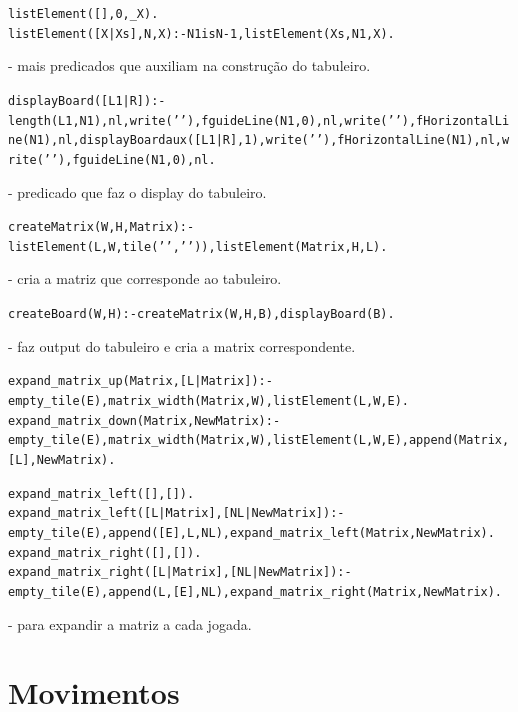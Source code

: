 \documentclass[a4paper]{article}
\begin{document}
\begin{alltt}
	listElement([],0, _X).
	listElement([X|Xs], N, X) :- N1 is N - 1,  listElement(Xs, N1, X).
\end{alltt}
		\normalfont - mais predicados que auxiliam na construção do tabuleiro. 
\begin{alltt}
	displayBoard([L1|R]) :-  length(L1,N1), nl,write('  '), \newline fguideLine(N1, 0), nl,write('  '), fHorizontalLine(N1), \newline nl, displayBoardaux([L1|R],1),  write('  '), fHorizontalLine(N1), \newline nl, write('  '), fguideLine(N1, 0), nl.
\end{alltt}
		\normalfont - predicado que faz o display do tabuleiro.

\begin{alltt}
	createMatrix(W, H, Matrix) :- listElement(L,W,tile(' ',' ')), \newline listElement(Matrix,H,L). 
\end{alltt}
		\normalfont - cria a matriz que corresponde ao tabuleiro.

\begin{alltt}
	createBoard(W,H) :- createMatrix(W,H, B), displayBoard(B).
\end{alltt}
		\normalfont - faz output do tabuleiro e cria a matrix correspondente.
\begin{alltt}
	expand_matrix_up(Matrix, [L|Matrix]) :- empty_tile( E ), \newline matrix_width(Matrix, W), listElement(L, W, E).
	expand_matrix_down(Matrix, NewMatrix) :- empty_tile( E ), \newline matrix_width(Matrix, W), listElement(L, W, E),\newline append(Matrix, [L], NewMatrix).

	expand_matrix_left([],[]).
	expand_matrix_left([L|Matrix], [NL|NewMatrix]):- empty_tile( E ), \newline append([E], L, NL), expand_matrix_left(Matrix, NewMatrix).
	expand_matrix_right([],[]).
	expand_matrix_right([L|Matrix], [NL|NewMatrix]):- empty_tile( E ), \newline append(L, [E], NL), expand_matrix_right(Matrix, NewMatrix). 
\end{alltt}
		\normalfont - para expandir a matriz a cada jogada. 


\section{Movimentos}
\end{document}
